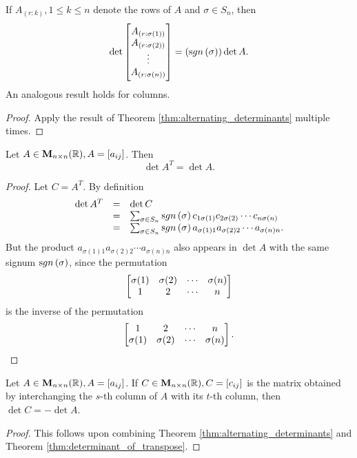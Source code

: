 \begin{cor}If $A_{(r:k)}, 1 \leq k \leq n$ denote the rows of $A$
and $\sigma \in S_n$, then $$\det \begin{bmatrix} A_{(r:\sigma
(1))} \cr A_{(r:\sigma (2))} \cr \vdots \cr A_{(r:\sigma (n))}\cr
\end{bmatrix} = (\sgn{\sigma})\det A. $$An analogous result holds
for columns. \label{cor:alternating_determinants}\end{cor}
\begin{proof}
Apply the result of Theorem \ref{thm:alternating_determinants}
multiple times.
\end{proof}
\begin{thm} \label{thm:determinant_of_transpose}
Let $A \in {\mathbf M}_{n\times n}( \mathbb{R}), A = [a_{ij}]$. Then $$\det A^T =
\det A.$$
\end{thm}
\begin{proof}
Let $C = A^T$. By definition $$\begin{array}{lll}\det A^T & = &
\det C \\ & = &  \sum _{\sigma \in S_n} \sgn{\sigma} c_{1\sigma
(1)}c_{2\sigma (2)} \cdots c_{n\sigma (n)} \\ &   = &  \sum
_{\sigma \in S_n} \sgn{\sigma} a_{\sigma (1)1}a_{\sigma (2)2}
\cdots a_{\sigma (n)n}. \end{array}$$But the product $a_{\sigma
(1)1}a_{\sigma (2)2} \cdots a_{\sigma (n)n}$ also appears in $\det
A$ with the same signum $\sgn{\sigma}$, since the permutation
$$  \begin{bmatrix}\sigma (1) & \sigma (2) & \cdots & \sigma (n)\cr 1 & 2 & \cdots & n \cr
\end{bmatrix}$$is the inverse of the permutation
$$  \begin{bmatrix}1 & 2 & \cdots & n \cr \sigma (1) & \sigma (2) & \cdots & \sigma (n)\cr
\end{bmatrix}.$$
\end{proof}
\begin{cor}\label{cor:alternating_determinants_1}
Let $A \in {\mathbf M}_{n\times n}( \mathbb{R}), A = [a_{ij}]$. If $C \in
{\mathbf M}_{n\times n}( \mathbb{R}), C = [c_{ij}]$ is the matrix obtained by
interchanging the $s$-th column of $A$ with its $t$-th column, then
$\det C = -\det A$.
\end{cor}
\begin{proof}
This follows upon combining Theorem
\ref{thm:alternating_determinants} and Theorem
\ref{thm:determinant_of_transpose}.
\end{proof}
